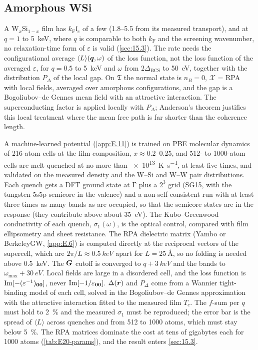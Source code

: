 \subsection{Amorphous WSi}

A W$_x$Si$_{1-x}$ film has $k_{\mathrm{F}}\mathfrak{l}_e$ of a few (1.8--5.5 from its measured transport), and at $q = 1$ to \SI{5}{keV}, where $q$ is comparable to both $k_{\mathrm{F}}$ and the screening wavenumber, no relaxation-time form of $\varepsilon$ is valid (\cref{sec:15.3}). The rate needs the configurational average $\langle L\rangle(\bm{q},\omega)$ of the loss function, not the loss function of the averaged $\varepsilon$, for $q = 0.5$ to \SI{5}{keV} and $\omega$ from $2\Delta_{\mathrm{BCS}}$ to \SI{50}{eV}, together with the distribution $P_\Delta$ of the local gap. On $\mathfrak{T}$ the normal state is $n_B = 0$, $\mathcal{X}$ = RPA with local fields, averaged over amorphous configurations, and the gap is a Bogoliubov--de Gennes mean field with an attractive interaction. The superconducting factor is applied locally with $P_\Delta$; Anderson's theorem justifies this local treatment where the mean free path is far shorter than the coherence length.

A machine-learned potential (\cref{app:E.11}) is trained on PBE molecular dynamics of 216-atom cells at the film composition, $x \approx 0.2$--0.25, and 512- to 1000-atom cells are melt-quenched at no more than \SI{e13}{K.s^{-1}}, at least five times, and validated on the measured density and the W--Si and W--W pair distributions. Each quench gets a DFT ground state at $\mathrm{\Gamma}$ plus a $2^3$ grid (SG15, with the tungsten 5s5p semicore in the valence) and a non-self-consistent run with at least three times as many bands as are occupied, so that the semicore states are in the response (they contribute above about \SI{35}{eV}). The Kubo--Greenwood conductivity of each quench, $\sigma_1(\omega)$, is the optical control, compared with film ellipsometry and sheet resistance. The RPA dielectric matrix (Yambo or BerkeleyGW, \cref{app:E.6}) is computed directly at the reciprocal vectors of the supercell, which are $2\pi/L \approx \SI{0.5}{keV}$ apart for $L = \SI{25}{\angstrom}$, so no folding is needed above \SI{0.5}{keV}. The $\bm{G}$ cutoff is converged to $q + \SI{3}{keV}$ and the bands to $\omega_{\mathrm{max}} + \SI{30}{eV}$. Local fields are large in a disordered cell, and the loss function is $\operatorname{Im}[-(\varepsilon^{-1})_{\bm{0}\bm{0}}]$, never $\operatorname{Im}[-1/\varepsilon_{\bm{0}\bm{0}}]$. $\Delta(\bm{r})$ and $P_\Delta$ come from a Wannier tight-binding model of each cell, solved in the Bogoliubov--de Gennes approximation with the attractive interaction fitted to the measured film $T_c$. The $f$-sum per $q$ must hold to \SI{2}{\percent} and the measured $\sigma_1$ must be reproduced; the error bar is the spread of $\langle L\rangle$ across quenches and from 512 to 1000 atoms, which must stay below \SI{5}{\percent}. The RPA matrices dominate the cost at tens of gigabytes each for 1000 atoms (\cref{tab:E20-params}), and the result enters \cref{sec:15.3}.

